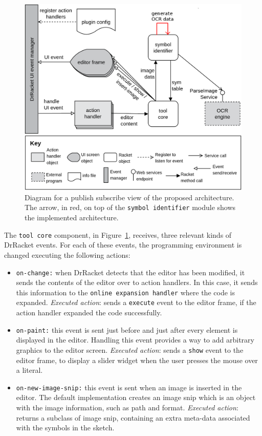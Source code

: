 \begin{figure}[htb]
    \centering
    \includegraphics[scale=0.22]{images/solution}
    \caption{Diagram for a publish subscribe view of the proposed architecture. The arrow, in red, on top of the \texttt{symbol identifier} module shows the implemented architecture.}
    \label{fig:solution}
\end{figure}

The \texttt{tool core} component, in Figure~\ref{fig:solution}, receives, three relevant kinds of DrRacket events. For each of these events, the programming environment is changed executing the following actions:

\begin{itemize}
    \item \texttt{on-change:} when DrRacket detects that the editor has been modified, it sends the contents of the editor over to action handlers.    In this case, it sends this information to the \texttt{online expansion handler} where the code is expanded. \textit{Executed action}: sends a \texttt{execute} event to the editor frame, if the action handler expanded the code successfully. 

    \item \texttt{on-paint:} this event is sent just before and just after every element is displayed in the editor. Handling this event provides a way to add arbitrary graphics to the editor screen. \textit{Executed action}: sends a \texttt{show} event to the editor frame, to display a slider widget when the user presses the mouse over a literal.

    \item \texttt{on-new-image-snip:} this event is sent when an image is inserted in the editor. The default implementation creates an image snip which is an object with the image information, such as path and format. \textit{Executed action}:  returns a subclass of image snip, containing an extra meta-data associated with the symbols in the sketch.
\end{itemize}

